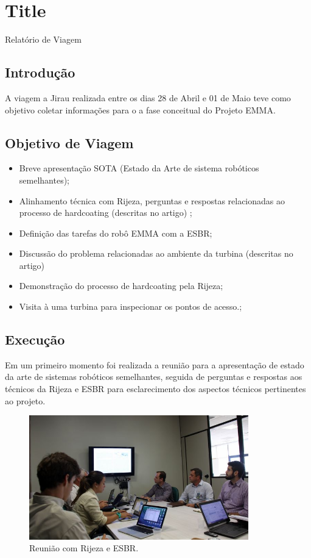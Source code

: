 \documentclass{article}
\begin{document}
\section{Title}
Relatório de Viagem
\subsection{Introdução}
A viagem a Jirau realizada entre os dias 28 de Abril e 01 de Maio teve como
objetivo coletar informações para o a fase conceitual do Projeto EMMA. 

\subsection{Objetivo de Viagem}
\begin{itemize}
  \item Breve apresentação SOTA (Estado da Arte de sistema robóticos
  seme\-lhantes);
  \item Alinhamento técnica com Rijeza, perguntas e respostas relacionadas ao
  processo de hardcoating (descritas no artigo) ;
\item Definição das tarefas do robô EMMA com a ESBR;
\item Discussão do problema relacionadas ao ambiente da turbina (descritas no
artigo) 
\item Demonstração do processo de hardcoating pela Rijeza;
\item Visita à uma turbina para inspecionar os pontos de acesso.;
\end{itemize}


\subsection{Execução}
Em um primeiro momento foi realizada a reunião para a apresentação de estado da
arte de sistemas robóticos semelhantes, seguida de perguntas e respostas aos
técnicos da Rijeza e ESBR para esclarecimento dos aspectos técnicos pertinentes
ao projeto.

\begin{figure}[H]
\centering
\includegraphics[width=0.85\textwidth]{Fotos/img_4836.jpg}
\caption{Reunião com Rijeza e ESBR.}
\end{figure}
\end{document}
